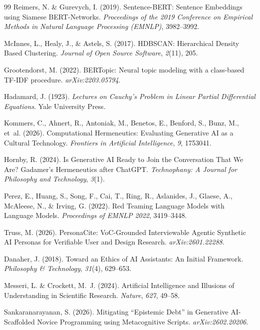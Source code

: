 \documentclass[11pt,a4paper]{article}
\theoremstyle{definition}
\theoremstyle{plain}
\theoremstyle{remark}
\begin{document}
\begin{thebibliography}{99}
  Reimers, N. \& Gurevych, I. (2019).
  Sentence-BERT: Sentence Embeddings using Siamese BERT-Networks.
  \textit{Proceedings of the 2019 Conference on Empirical Methods in Natural Language Processing (EMNLP)}, 3982--3992.

  McInnes, L., Healy, J., \& Astels, S. (2017).
  HDBSCAN: Hierarchical Density Based Clustering.
  \textit{Journal of Open Source Software}, \textit{2}(11), 205.

  Grootendorst, M. (2022).
  BERTopic: Neural topic modeling with a class-based TF-IDF procedure.
  \textit{arXiv:2203.05794}.

  Hadamard, J. (1923).
  \textit{Lectures on Cauchy's Problem in Linear Partial Differential Equations}.
  Yale University Press.

  Kommers, C., Ahnert, R., Antoniak, M., Benetos, E., Benford, S., Bunz, M., et~al. (2026).
  Computational Hermeneutics: Evaluating Generative AI as a Cultural Technology.
  \textit{Frontiers in Artificial Intelligence}, \textit{9}, 1753041.

  Hornby, R. (2024).
  Is Generative AI Ready to Join the Conversation That We Are? Gadamer's Hermeneutics after ChatGPT.
  \textit{Technophany: A Journal for Philosophy and Technology}, \textit{3}(1).

  Perez, E., Huang, S., Song, F., Cai, T., Ring, R., Aslanides, J., Glaese, A., McAleese, N., \& Irving, G. (2022).
  Red Teaming Language Models with Language Models.
  \textit{Proceedings of EMNLP 2022}, 3419--3448.

  Truss, M. (2026).
  PersonaCite: VoC-Grounded Interviewable Agentic Synthetic AI Personas for Verifiable User and Design Research.
  \textit{arXiv:2601.22288}.

  Danaher, J. (2018).
  Toward an Ethics of AI Assistants: An Initial Framework.
  \textit{Philosophy \& Technology}, \textit{31}(4), 629--653.

  Messeri, L. \& Crockett, M.~J. (2024).
  Artificial Intelligence and Illusions of Understanding in Scientific Research.
  \textit{Nature}, \textit{627}, 49--58.

  Sankaranarayanan, S. (2026).
  Mitigating ``Epistemic Debt'' in Generative AI-Scaffolded Novice Programming using Metacognitive Scripts.
  \textit{arXiv:2602.20206}.

\end{thebibliography}


\end{document}
